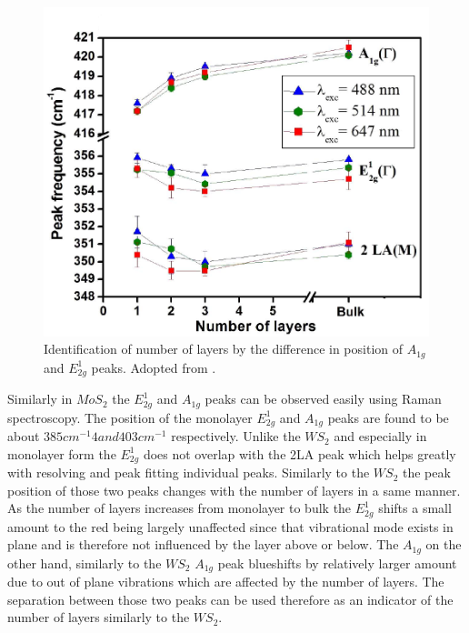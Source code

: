 \begin{figure}
	\begin{center}
		\includegraphics[scale=0.3]{NumberLayerIdentificationRaman.png}
		\caption{Identification of number of layers by the difference in position of $A_{1g}$ and $E^1_{2g}$ peaks. Adopted from \cite{Berkdemir2013}.}
		\label{fig:LayerNumberIdentificationRamanShiftWS2}
	\end{center}
\end{figure}

Similarly in $MoS_2$ the $E^1_{2g}$ and $A_{1g}$ peaks can be observed easily using Raman spectroscopy. The position of the monolayer $E^1_{2g}$ and $A_{1g}$ peaks are found to be about $385 cm^{-1}4 and 403 cm^{-1}$ respectively. Unlike the $WS_2$ and especially in monolayer form the $E^1_{2g}$ does not overlap with the 2LA peak which helps greatly with resolving and peak fitting individual peaks. Similarly to the $WS_2$ the peak position of those two peaks changes with the number of layers in a same manner. As the number of layers increases from monolayer to bulk the $E^1_{2g}$ shifts a small amount to the red being largely unaffected since that vibrational mode exists in plane and is therefore not influenced by the layer above or below. The $A_{1g}$ on the other hand, similarly to the $WS_2$ $A_{1g}$ peak blueshifts by relatively larger amount due to out of plane vibrations which are affected by the number of layers. The separation between those two peaks can be used therefore as an indicator of the number of layers similarly to the $WS_2$. 

